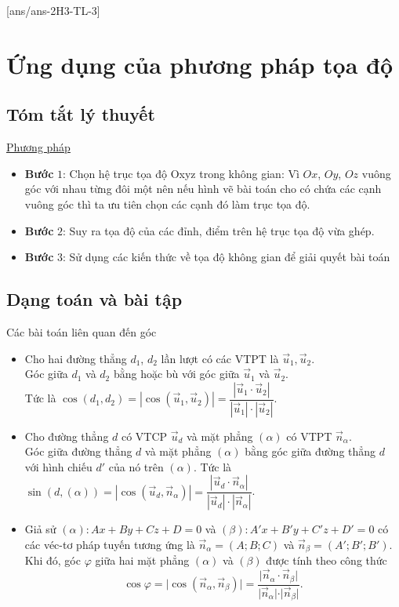 [ans/ans-2H3-TL-3]
\setcounter{dang}{0}
\setcounter{vd}{0}
\section{Ứng dụng của phương pháp tọa độ}
\subsection{Tóm tắt lý thuyết}
\begin{tomtat}
\underline{Phương pháp}
	\begin{itemize}
		\item \textbf{Bước} $1$: Chọn hệ trục tọa độ Oxyz trong không gian: Vì $Ox$, $Oy$, $Oz$ vuông góc với nhau từng đôi một nên nếu hình vẽ bài toán cho có chứa các cạnh vuông góc thì ta ưu tiên chọn các cạnh đó	làm trục tọa độ.
		\item \textbf{Bước} $2$: Suy ra tọa độ của các đỉnh, điểm trên hệ trục tọa độ vừa ghép.
		\item  \textbf{Bước} $3$: Sử dụng các kiến thức về tọa độ không gian để giải quyết bài toán
	\end{itemize}
\end{tomtat}
\subsection{Dạng toán và bài tập}
\begin{dang}{Các bài toán liên quan đến góc}
	\begin{itemize}
		\item Cho hai đường thẳng $d_1$, $d_2$ lần lượt có các VTPT là $\vec{u}_1,\vec{u}_2$.\\
		Góc giữa $d_1$ và $d_2$ bằng hoặc bù với góc giữa $\vec{u}_1$ và $\vec{u}_2$.\\
		Tức là $\cos (d_1,d_2 )=\left| \cos (\vec{u}_1,\vec{u}_2 ) \right|=\dfrac{\left| \vec{u}_1\cdot\vec{u}_2 \right|}{\left| \vec{u}_1 \right|\cdot\left| \vec{u}_2 \right|}$.
		\item Cho đường thẳng $d$ có VTCP $\vec{u}_d$ và mặt phẳng $(\alpha)$ có VTPT $\vec{n}_\alpha$.\\
		Góc giữa đường thẳng $d$ và mặt phẳng $(\alpha)$ bằng góc giữa đường thẳng $d$ với hình chiếu $d'$ của nó trên $(\alpha)$. Tức là $\sin (d,(\alpha ) )=\left| \cos (\vec{u}_d,\vec{n}_\alpha ) \right|=\dfrac{\left| \vec{u}_d\cdot\vec{n}_\alpha \right|}{\left| \vec{u}_d \right|\cdot\left| \vec{n}_\alpha \right|}$.
		\item Giả sử $(\alpha):Ax+By+Cz+D=0$ và $(\beta): A'x+B'y+C'z+D'=0$ có các véc-tơ pháp tuyến tương ứng là $\vec{n}_{\alpha}=(A;B;C)$ và $\vec{n}_{\beta}=(A';B';B')$. Khi đó, góc $\varphi$ giữa hai mặt phẳng $(\alpha)$ và $(\beta)$ được tính theo công thức
		$$\cos\varphi=\vert \cos(\vec{n}_{\alpha},\vec{n}_{\beta})\vert=\dfrac{\vert\vec{n}_{\alpha}\cdot\vec{n}_{\beta}\vert}{\vert\vec{n}_{\alpha}\vert\cdot\vert\vec{n}_{\beta}\vert}.$$
	\end{itemize}
\end{dang}
\noindent
